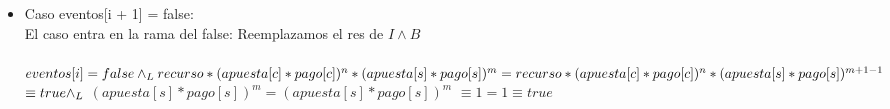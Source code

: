 \documentclass[10pt,a4paper]{article}
\begin{document}
\begin{proof*}
    \begin{minipage}[t]{19cm}
        \begin{itemize}
        \item{Caso eventos[i + 1] = false: \\
        El caso entra en la rama del false: Reemplazamos el res de $I \land B$ \hspace{0.1cm}
        \\  \\  \newline
        \hspace{0.8cm}
        $eventos[i] = false \land _L recurso*(apuesta[c]*pago[c]) ^{n} *(apuesta[s]*pago[s]) ^{m} = recurso*(apuesta[c]*pago[c]) ^{n} *(apuesta[s]*pago[s]) ^{m +1 - 1}$ $\equiv true \land _L$ $(apuesta[s]*pago[s])^{m} = (apuesta[s]*pago[s])^{m}$ $\equiv 1 = 1 \equiv true$
    }
    \end{itemize}
    \end{minipage}
    

\end{proof*}
\end{document}
